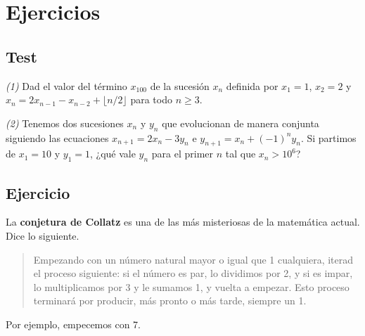 \documentclass[]{book}
\theoremstyle{definition}
\theoremstyle{definition}
\theoremstyle{definition}
\theoremstyle{remark}
\begin{document}
\hypertarget{ejercicios-6}{%
\section{Ejercicios}\label{ejercicios-6}}

\hypertarget{test-5}{%
\subsection*{Test}\label{test-5}}

\emph{(1)} Dad el valor del término \(x_{100}\) de la sucesión \(x_n\) definida por \(x_1=1\), \(x_2=2\) y \(x_{n}=2x_{n-1}-x_{n-2}+\lfloor n/2\rfloor\) para todo \(n\geqslant 3\).

\emph{(2)} Tenemos dos sucesiones \(x_n\) y \(y_n\) que evolucionan de manera conjunta siguiendo las ecuaciones \(x_{n+1}=2x_n-3y_n\) e \(y_{n+1}=x_n+(-1)^ny_n\). Si partimos de \(x_1=10\) y \(y_1=1\), ¿qué vale \(y_n\) para el primer \(n\) tal que \(x_n>10^6\)?

\hypertarget{ejercicio-6}{%
\subsection*{Ejercicio}\label{ejercicio-6}}

La \textbf{conjetura de Collatz} es una de las más misteriosas de la matemática actual. Dice lo siguiente.

\begin{quote}
Empezando con un número natural mayor o igual que 1 cualquiera, iterad el proceso siguiente: si el número es par, lo dividimos por 2, y si es impar, lo multiplicamos por 3 y le sumamos 1, y vuelta a empezar. Esto proceso terminará por producir, más pronto o más tarde, siempre un 1.
\end{quote}

Por ejemplo, empecemos con 7.
\end{document}
